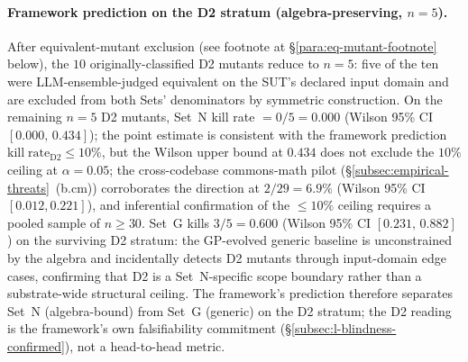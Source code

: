 \documentclass[manuscript]{acmart}
\begin{document}
\paragraph{Framework prediction on the D2 stratum (algebra-preserving, $n = 5$).}
After equivalent-mutant exclusion (see footnote at
\S\ref{para:eq-mutant-footnote} below), the $10$ originally-classified
D2 mutants reduce to $n = 5$: five of the ten were
LLM-ensemble-judged equivalent on the SUT's declared input domain
and are excluded from both Sets' denominators by symmetric construction.
On the remaining $n = 5$ D2 mutants, Set~N kill rate $= 0/5 = 0.000$
(Wilson 95\% CI $[0.000,\,0.434]$); the point estimate is consistent
with the framework prediction
$\mathrm{kill\;rate}_{\mathrm{D2}} \le 10\%$, but the Wilson upper bound
at $0.434$ does not exclude the $10\%$ ceiling at $\alpha = 0.05$; the
cross-codebase commons-math pilot
(\S\ref{subsec:empirical-threats}~(b.cm))
corroborates the direction at $2/29 = 6.9\%$
(Wilson 95\% CI $[0.012, 0.221]$), and inferential
confirmation of the $\le 10\%$ ceiling requires a pooled sample of
$n \ge 30$. Set~G kills $3/5 = 0.600$
(Wilson 95\% CI $[0.231,\,0.882]$) on the surviving D2 stratum:
the GP-evolved generic baseline is unconstrained by the algebra
and incidentally detects D2 mutants through input-domain edge cases,
confirming that D2 is a Set~N-specific scope boundary rather than a
substrate-wide structural ceiling. The framework's prediction
therefore separates Set~N (algebra-bound) from Set~G (generic) on
the D2 stratum; the D2 reading is the framework's own falsifiability
commitment (\S\ref{subsec:l-blindness-confirmed}), not a head-to-head metric.
\end{document}
